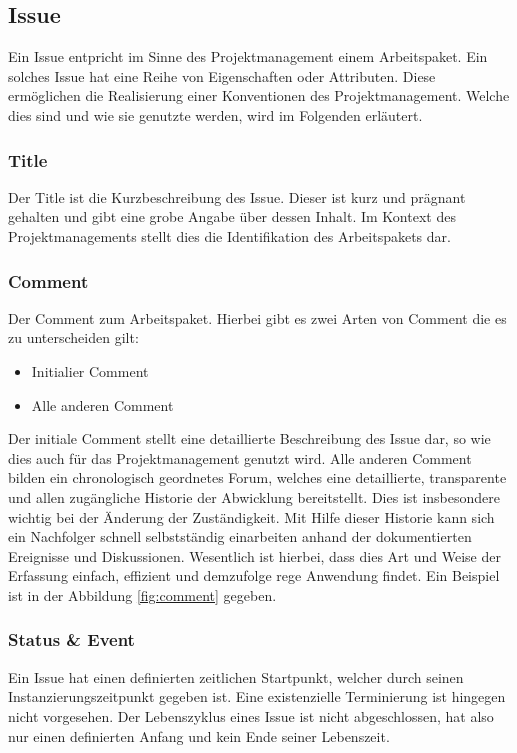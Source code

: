 \subsection{Issue}
Ein \gls{Issue} entpricht im Sinne des Projektmanagement einem Arbeitspaket.
Ein solches \gls{Issue} hat eine Reihe von Eigenschaften oder Attributen.
Diese ermöglichen die Realisierung einer Konventionen des Projektmanagement.
Welche dies sind und wie sie genutzte werden, wird im Folgenden erläutert.

\subsubsection{Title}
Der \gls{Title} ist die Kurzbeschreibung des \gls{Issue}. Dieser ist kurz und
prägnant gehalten und gibt eine grobe Angabe über dessen Inhalt. Im Kontext
des Projektmanagements stellt dies die Identifikation des Arbeitspakets dar.

\subsubsection{Comment}
Der \gls{Comment} zum Arbeitspaket. Hierbei gibt es zwei Arten von
\gls{Comment} die es zu unterscheiden gilt:

\begin{itemize}
	\item Initialier \gls{Comment}
	\item Alle anderen \gls{Comment}
\end{itemize}

Der initiale \gls{Comment} stellt eine detaillierte Beschreibung des
\gls{Issue} dar, so wie dies auch für das Projektmanagement genutzt wird.
Alle anderen \gls{Comment} bilden ein chronologisch geordnetes Forum,
welches eine detaillierte, transparente und allen zugängliche Historie der
Abwicklung bereitstellt. Dies ist insbesondere wichtig bei der Änderung der
Zuständigkeit. Mit Hilfe dieser Historie kann sich ein Nachfolger schnell
selbstständig einarbeiten anhand der dokumentierten Ereignisse und
Diskussionen. Wesentlich ist hierbei, dass dies Art und Weise der Erfassung
einfach, effizient und demzufolge rege Anwendung findet. Ein Beispiel ist
in der Abbildung \ref{fig:comment} gegeben.

\subsubsection{Status \& Event}
Ein \gls{Issue} hat einen definierten zeitlichen Startpunkt, welcher durch
seinen Instanzierungszeitpunkt gegeben ist. Eine existenzielle
Terminierung ist hingegen nicht vorgesehen. Der Lebenszyklus eines
\gls{Issue} ist nicht abgeschlossen, hat also nur einen definierten Anfang
und kein Ende seiner Lebenszeit.

